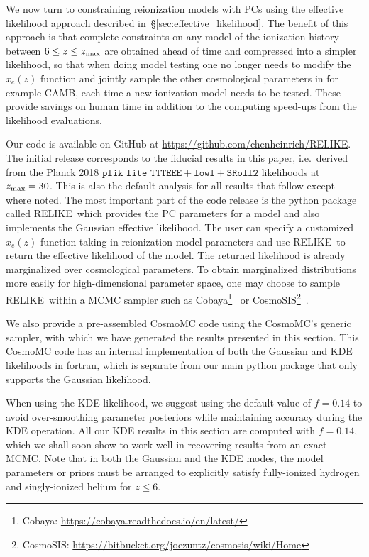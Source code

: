 \documentclass[aps,prd,twocolumn,amsmath,amssymb,showpacs,floatfix,superscriptaddress,nofootinbib]{revtex4-1}
\newcommand{\zmax}{z_{\rm max}}
\newcommand{\relike}{RELIKE}
\begin{document}
We now turn to constraining reionization models with PCs using the
effective likelihood approach described in~\S\ref{sec:effective_likelihood}.  The benefit of this approach is that
complete constraints on any model of the ionization history  between $6 \leq z \leq \zmax$ are obtained ahead of time and compressed into a simpler likelihood, so that when doing model testing one no longer needs to modify the $x_e(z)$ function and jointly sample the other cosmological parameters in for example CAMB, each time a new ionization model needs to be tested. These provide savings on human time in addition to the computing speed-ups from the likelihood evaluations.

Our code is available on GitHub at {\url{https://github.com/chenheinrich/RELIKE}}. The initial release corresponds to the fiducial results in this paper, i.e.\ derived from the Planck 2018 $\texttt{plik\_lite\_TTTEEE} + \texttt{lowl} + \texttt{SRoll2}$ likelihoods at $\zmax = 30$.  
This is also the default analysis for all results that follow except where noted.
The most important part of the code release is the python package called \relike\  which provides the PC parameters for a model and also implements the Gaussian effective likelihood. The user can specify a customized $x_e(z)$ function taking in reionization model parameters and use \relike\  to return the effective likelihood of the model. The returned likelihood is already marginalized over cosmological parameters. 
To obtain marginalized distributions more easily for high-dimensional parameter space, one may choose to sample \relike\ within a MCMC sampler such as Cobaya\footnote{Cobaya: \url{https://cobaya.readthedocs.io/en/latest/}}~\cite{Torrado:2020dgo,2020arXiv200505290T} or CosmoSIS\footnote{CosmoSIS: \url{https://bitbucket.org/joezuntz/cosmosis/wiki/Home}}~\cite{Zuntz:2014csq}.


We also provide a pre-assembled CosmoMC code using the CosmoMC's generic sampler, with which we have generated the results presented in this section. This CosmoMC code has an internal  implementation of both the Gaussian and KDE likelihoods in fortran, which is separate from our main python package that only supports the Gaussian likelihood. 

When using the KDE likelihood, we suggest using the default value of $f = 0.14$ to avoid over-smoothing parameter posteriors while maintaining accuracy during the KDE operation. All our KDE results in this section are computed with $f = 0.14$, which we shall soon show to work well in recovering results from an exact MCMC. Note that in both the Gaussian and the KDE modes, the model parameters or priors must be arranged to explicitly satisfy fully-ionized hydrogen and singly-ionized helium for $z\leq 6$. 
\end{document}
